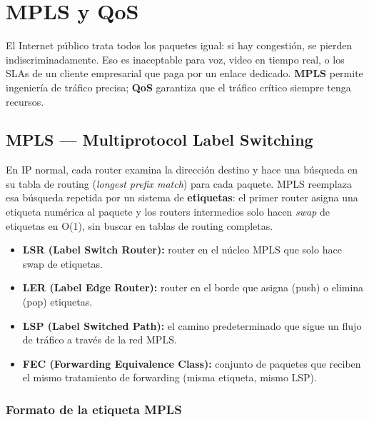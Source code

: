 
\chapter{ MPLS y QoS}

El Internet público trata todos los paquetes igual: si hay congestión, se pierden
indiscriminadamente. Eso es inaceptable para voz, video en tiempo real, o los SLAs
de un cliente empresarial que paga por un enlace dedicado. \textbf{MPLS} permite
ingeniería de tráfico precisa; \textbf{QoS} garantiza que el tráfico crítico siempre
tenga recursos.

\section{ MPLS --- Multiprotocol Label Switching}

\begin{concepto}
En IP normal, cada router examina la dirección destino y hace una búsqueda en su
tabla de routing (\emph{longest prefix match}) para cada paquete. MPLS reemplaza
esa búsqueda repetida por un sistema de \textbf{etiquetas}: el primer router asigna
una etiqueta numérica al paquete y los routers intermedios solo hacen \emph{swap} de
etiquetas en O(1), sin buscar en tablas de routing completas.

\begin{itemize}
    \item \textbf{LSR (Label Switch Router):} router en el núcleo MPLS que solo hace
          swap de etiquetas.
    \item \textbf{LER (Label Edge Router):} router en el borde que asigna (push) o
          elimina (pop) etiquetas.
    \item \textbf{LSP (Label Switched Path):} el camino predeterminado que sigue un
          flujo de tráfico a través de la red MPLS.
    \item \textbf{FEC (Forwarding Equivalence Class):} conjunto de paquetes que reciben
          el mismo tratamiento de forwarding (misma etiqueta, mismo LSP).
\end{itemize}
\end{concepto}

\subsection{Formato de la etiqueta MPLS}

